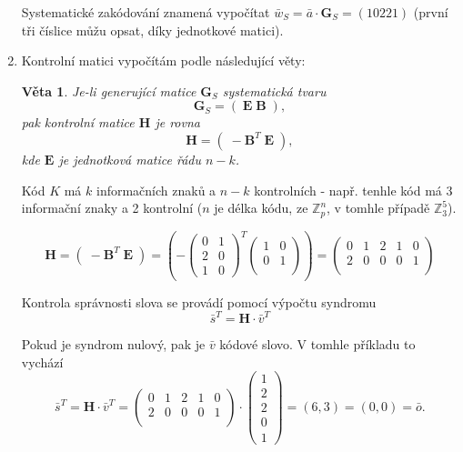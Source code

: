 \documentclass{article}
\newtheorem{veta}{Věta}[section]
\begin{document}
\begin{enumerate}
Systematické zakódování znamená vypočítat $\bar{w}_S = \bar{a}\cdot \mathbf{G}_S = (10221)$ (první tři číslice můžu opsat, díky jednotkové matici). 

	\item Kontrolní matici vypočítám podle následující věty:
	\begin{veta}\label{kontrolni-matice}
	Je-li generující matice $\mathbf{G}_S$ systematická tvaru
	\[ \mathbf{G}_S = (\;\mathbf{E}\; \mathbf{B}\;), \]
	pak kontrolní matice $\mathbf{H}$ je rovna
	\[ \mathbf{H} = (\;-\mathbf{B}^T\; \mathbf{E}\;), \]
	kde $\mathbf{E}$ je jednotková matice řádu $n-k$.
	\end{veta}
	
	Kód $K$ má $k$ informačních znaků a $n-k$ kontrolních - např. tenhle kód má 3 informační znaky a 2 kontrolní ($n$ je délka kódu, ze $\mathbb{Z}_p^n$, v tomhle případě $\mathbb{Z}_3^5$).
	
	\[ \mathbf{H} = (\;-\mathbf{B}^T\; \mathbf{E}\;) = \left( -\begin{pmatrix}
  0 & 1 \\
  2 & 0 \\
  1 & 0 
	\end{pmatrix}^T 
	\begin{pmatrix}
  1 & 0 \\
  0 & 1 \\
  \end{pmatrix}
	\right) = 
	\begin{pmatrix}
  0 & 1 & 2 & 1 & 0 \\
  2 & 0 & 0 & 0 & 1 \\
  \end{pmatrix}
	\]
	
	Kontrola správnosti slova se provádí pomocí výpočtu syndromu
	\begin{equation}
	\bar{s}^T = \mathbf{H}\cdot\bar{v}^T
	\label{syndrom}
	\end{equation}
	
	Pokud je syndrom nulový, pak je $\bar{v}$ kódové slovo. V tomhle příkladu to vychází
	\[ \bar{s}^T = \mathbf{H}\cdot\bar{v}^T = \begin{pmatrix}
  0 & 1 & 2 & 1 & 0 \\
  2 & 0 & 0 & 0 & 1 \\
  \end{pmatrix} \cdot 
  \begin{pmatrix}
  1 \\
  2 \\
  2 \\
  0 \\
  1
  \end{pmatrix} = (6,3) = (0,0) = \bar{o}.\]
   

\end{enumerate}
\end{document}
